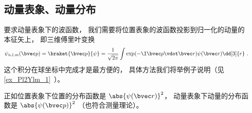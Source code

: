 \subsection{动量表象、动量分布}
要求动量表象下的波函数， 我们需要将位置表象的波函数投影到归一化的动量的本征矢上， 即三维傅里叶变换
\begin{equation}
\psi_{n,l,m}(\bvec p) = \braket{\bvec p}{\psi} = \frac{1}{\sqrt{2\pi}} \int \exp(-\I \bvec p \vdot \bvec r) \psi(\bvec r) \dd[3]{r}~.
\end{equation}
这个积分在球坐标中完成才是最方便的， 具体方法我们将举例子说明（见\autoref{ex_Pl2Ylm_1}~）。

正如位置表象下位置的分布函数是 $\abs{\psi(\bvec r)}^2$， 动量表象下动量的分布函数是 $\abs{\psi(\bvec p)}^2$ （也符合测量理论）。
